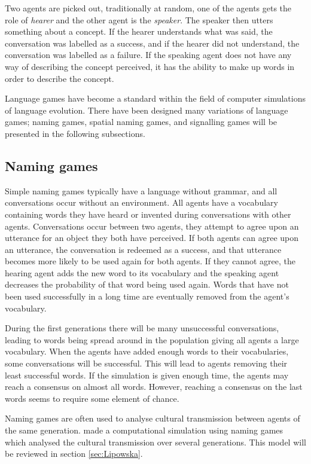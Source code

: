 Two agents are picked out, traditionally at random, one of the agents gets the role of \textit{hearer} and the other agent is the \textit{speaker}. The speaker then utters something about a concept. If the hearer understands what was said, the conversation was labelled as a success, and if the hearer did not understand, the conversation was labelled as a failure. If the speaking agent does not have any way of describing the concept perceived, it has the ability to make up words in order to describe the concept. 

Language games have become a standard within the field of computer simulations of language evolution. There have been designed many variations of language games; naming games, spatial naming games, and signalling games will be presented in the following subsections.

\subsection{Naming games}
Simple naming games typically have a language without grammar, and all conversations occur without an environment. All agents have a vocabulary containing words they have heard or invented during conversations with other agents. Conversations occur between two agents, they attempt to agree upon an utterance for an object they both have perceived. If both agents can agree upon an utterance, the conversation is redeemed as a success, and that utterance becomes more likely to be used again for both agents. If they cannot agree, the hearing agent adds the new word to its vocabulary and the speaking agent decreases the probability of that word being used again. Words that have not been used successfully in a long time are eventually removed from the agent's vocabulary.

During the first generations there will be many unsuccessful conversations, leading to words being spread around in the population giving all agents a large vocabulary. When the agents have added enough words to their vocabularies, some conversations will be successful. This will lead to agents removing their least successful words. If the simulation is given enough time, the agents may reach a consensus on almost all words. However, reaching a consensus on the last words seems to require some element of chance.

Naming games are often used to analyse cultural transmission between agents of the same generation. \citeauthor{lipowska2011naming} made a computational simulation using naming games which analysed the cultural transmission over several generations. This model will be reviewed in section \ref{sec:Lipowska}.

